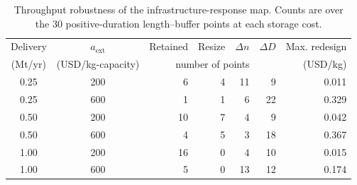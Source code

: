 \begin{table}[!t]
\centering
\caption{Throughput robustness of the infrastructure-response map. Counts are over the 30 positive-duration length--buffer points at each storage cost.}
\label{tab:buffer_design_robustness_si}
\small
\setlength{\tabcolsep}{4pt}
\begin{tabular}{ccrrrrr}
\toprule
Delivery & $a_{\mathrm{ext}}$ & Retained & Resize & $\Delta n$ & $\Delta D$ & Max. redesign \\
(Mt/yr) & (USD/kg-capacity) & \multicolumn{4}{c}{number of points} & (USD/kg) \\
\midrule
0.25 & 200 & 6 & 4 & 11 & 9 & 0.011 \\
0.25 & 600 & 1 & 1 & 6 & 22 & 0.329 \\
0.50 & 200 & 10 & 7 & 4 & 9 & 0.042 \\
0.50 & 600 & 4 & 5 & 3 & 18 & 0.367 \\
1.00 & 200 & 16 & 0 & 4 & 10 & 0.015 \\
1.00 & 600 & 5 & 0 & 13 & 12 & 0.174 \\
\bottomrule
\end{tabular}
\end{table}
